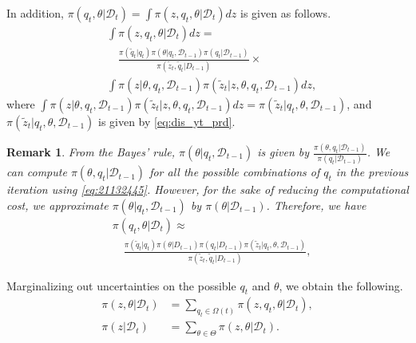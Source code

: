\documentclass[letterpaper, 10 pt, conference]{ieeeconf}
\newtheorem{rem}[thm]{Remark} \newtheorem{example}[thm]{Example}
\newcommand{\mc}[1]{\mathcal{#1}} \newcommand{\mb}[1]{\mathbf{#1}}
\newcommand{\D}[2]{\mc{D}_{#2}}
\newcommand{\q}[1]{{q_{#1}}}
\begin{document}
In addition, $\pi \left(\q{t},\theta |\D{}{t} \right) =\int {\pi \left( z,\q{t},\theta |\D{}{t} \right) dz }$ is given as follows.
\begin{equation}
\begin{split}
 &\int {\pi \left( z,\q{t},\theta |\D{}{t} \right) dz}= \\ 
&\quad \frac{ \pi \left( \tilde{q}_t|\q{t} \right)\pi \left( \theta |q_t, \D{0}{t - 1} \right) \pi \left( \q{t}|\D{0}{t - 1} \right)}{{\pi \left( {{{\tilde z}_t},{{\tilde q}_t}|{D_{t - 1}}} \right)}} \times \\
&\int{\pi \left( z|\theta,q_t ,\D{0}{t - 1} \right) \pi \left( \tilde{z}_t|z,\theta,\q{t},\D{}{t-1} \right) dz},
\end{split}
\label{eq:21132445}
\end{equation}
where $\int{\pi \left( z|\theta,q_t ,\D{0}{t - 1} \right) \pi \left( \tilde{z}_t|z,\theta,\q{t},\D{}{t-1} \right) dz} = \pi\left(\tilde{z}_t|\q{t},\theta,\D{0}{t-1}\right)$,
and $\pi (\tilde{z}_t|\q{t},\theta,\D{0}{t-1})$ is given by \eqref{eq:dis_yt_prd}.

\begin{rem}
From the Bayes' rule, $\pi (\theta |q_t, \D{0}{t - 1})$ is given by $\frac{\pi \left( \theta, q_t| \D{0}{t - 1} \right) }{\pi \left( q_t| \D{0}{t - 1} \right)}$. 
 We can compute $\pi \left( \theta, q_t| \D{0}{t - 1} \right)$ for all the possible combinations of $q_t$ in the previous iteration using \eqref{eq:21132445}. However, for the sake of reducing the computational cost, we approximate $\pi \left( \theta |q_t, \D{0}{t - 1} \right)$ by $\pi \left( \theta |\D{0}{t - 1} \right)$. Therefore, we have 
\begin{equation*}
\begin{split}
&\pi \left(\q{t},\theta |\D{}{t} \right) \approx \\
& \quad \frac{{\pi \left( {{{\tilde q}_t}|{q_t}} \right)\pi \left( {\theta |{D_{t - 1}}} \right)\pi \left( {{q_t}|{D_{t - 1}}} \right)} \pi\left(\tilde{z}_t|\q{t},\theta,\D{0}{t-1} \right)}{{\pi \left( {{{\tilde z}_t},{{\tilde q}_t}|{D_{t - 1}}} \right)}},
\end{split}
\end{equation*}
 \end{rem}

Marginalizing out uncertainties on the possible $\q{t}$ and $\theta$, we obtain the  {following}.
\begin{equation}
\begin{split}
\pi \left( z,\theta |\D{0}{t} \right) &= \sum\limits_{\q{t} \in \Omega(t)} {\pi \left( z,\q{t},\theta |\D{0}{t} \right)},\\
\pi \left( z|\D{0}{t} \right) &= \sum\limits_{\theta \in \Theta} {\pi \left( z,\theta |\D{0}{t} \right)}.
\end{split}
\label{eq:}
\end{equation}
\end{document}
